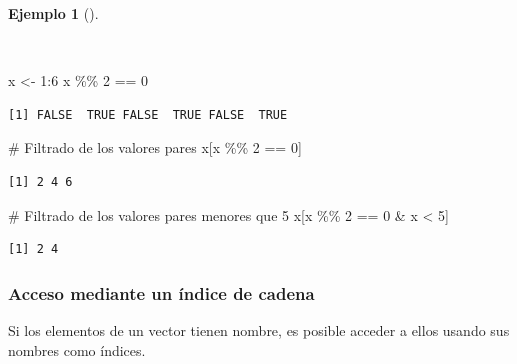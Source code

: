 \documentclass[
  a4paper,
]{scrreport}
\newenvironment{Shaded}{\begin{snugshade}}{\end{snugshade}}
\newcommand{\CommentTok}[1]{\textcolor[rgb]{0.37,0.37,0.37}{#1}}
\newcommand{\DecValTok}[1]{\textcolor[rgb]{0.68,0.00,0.00}{#1}}
\newcommand{\NormalTok}[1]{\textcolor[rgb]{0.00,0.23,0.31}{#1}}
\newcommand{\OtherTok}[1]{\textcolor[rgb]{0.00,0.23,0.31}{#1}}
\newcommand{\SpecialCharTok}[1]{\textcolor[rgb]{0.37,0.37,0.37}{#1}}
\theoremstyle{definition}
\theoremstyle{definition}
\newtheorem{example}{Ejemplo}[chapter]
\theoremstyle{remark}
\begin{document}
\begin{example}[]\protect\hypertarget{exm-filtros}{}\label{exm-filtros}

~

\begin{Shaded}
\begin{Highlighting}[]
\NormalTok{x }\OtherTok{\textless{}{-}} \DecValTok{1}\SpecialCharTok{:}\DecValTok{6}
\NormalTok{x }\SpecialCharTok{\%\%} \DecValTok{2} \SpecialCharTok{==} \DecValTok{0}
\end{Highlighting}
\end{Shaded}

\begin{verbatim}
[1] FALSE  TRUE FALSE  TRUE FALSE  TRUE
\end{verbatim}

\begin{Shaded}
\begin{Highlighting}[]
\CommentTok{\# Filtrado de los valores pares}
\NormalTok{x[x }\SpecialCharTok{\%\%} \DecValTok{2} \SpecialCharTok{==} \DecValTok{0}\NormalTok{]}
\end{Highlighting}
\end{Shaded}

\begin{verbatim}
[1] 2 4 6
\end{verbatim}

\begin{Shaded}
\begin{Highlighting}[]
\CommentTok{\# Filtrado de los valores pares menores que 5}
\NormalTok{x[x }\SpecialCharTok{\%\%} \DecValTok{2} \SpecialCharTok{==} \DecValTok{0} \SpecialCharTok{\&}\NormalTok{ x }\SpecialCharTok{\textless{}} \DecValTok{5}\NormalTok{]}
\end{Highlighting}
\end{Shaded}

\begin{verbatim}
[1] 2 4
\end{verbatim}

\end{example}

\subsubsection{Acceso mediante un índice de
cadena}\label{acceso-mediante-un-uxedndice-de-cadena}

Si los elementos de un vector tienen nombre, es posible acceder a ellos
usando sus nombres como índices.
\end{document}
